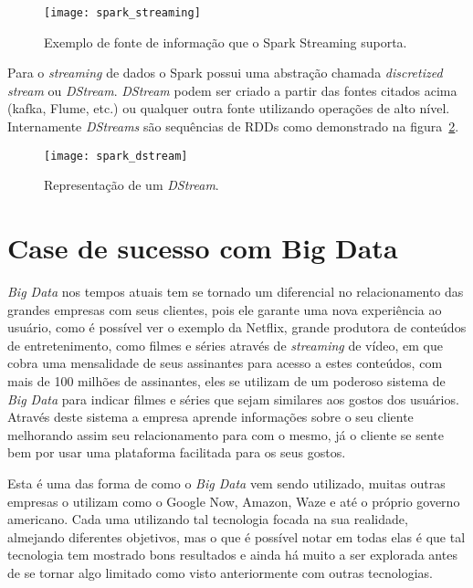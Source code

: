 \begin{figure}[!h]
	\caption{\label{fig:sparkstreaming} Exemplo de fonte de informação que o Spark Streaming suporta.}
	\begin{center}
		\texttt{[image: spark\_streaming]}
	\end{center}
\end{figure}

Para o \textit{streaming} de dados o Spark possui uma abstração chamada \textit{discretized stream} ou \textit{DStream}. \textit{DStream} podem ser criado a partir das fontes citados acima (kafka, Flume, etc.) ou qualquer outra fonte utilizando operações de alto nível. Internamente \textit{DStreams} são sequências de RDDs como demonstrado na figura~\ref{fig:sparkdstream}.

\begin{figure}[!h]
	\caption{\label{fig:sparkdstream} Representação de um \textit{DStream}.}
	\begin{center}
		\texttt{[image: spark\_dstream]}
	\end{center}
\end{figure}

\section{Case de sucesso com Big Data}
\label{sec:casebigdata}
\textit{Big Data} nos tempos atuais tem se tornado um diferencial no relacionamento das grandes empresas com seus clientes, pois ele garante uma nova experiência ao usuário, como é possível ver o exemplo da Netflix, grande produtora de conteúdos de entretenimento, como filmes e séries através de \textit{streaming} de vídeo, em que cobra uma mensalidade de seus assinantes para acesso a estes conteúdos, com mais de 100 milhões de assinantes, eles se utilizam de um poderoso sistema de \textit{Big Data} para indicar filmes e séries que sejam similares aos gostos dos usuários. Através deste sistema a empresa aprende informações sobre o seu cliente melhorando assim seu relacionamento para com o mesmo, já o cliente se sente bem por usar uma plataforma facilitada para os seus gostos.

Esta é uma das forma de como o \textit{Big Data} vem sendo utilizado, muitas outras empresas o utilizam como o Google Now, Amazon, Waze e até o próprio governo americano. Cada uma utilizando tal tecnologia focada na sua realidade, almejando diferentes objetivos, mas o que é possível notar em todas elas é que tal tecnologia tem mostrado bons resultados e ainda há muito a ser explorada antes de se tornar algo limitado como visto anteriormente com outras tecnologias.~\cite{case}



